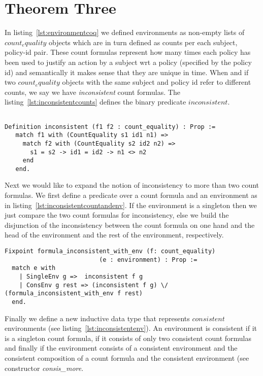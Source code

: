 \section{Theorem Three}

In listing~\ref{lst:environmentcoq} we defined environments as non-empty lists of $count_equality$ objects which are in turn defined as counts per each subject, policy-id pair. These count formulas represent how many times each policy has been used to justify an action by a subject wrt a policy (specified by the policy id) and semantically it makes sense that they are unique in time. When and if two $count_equality$ objects with the same subject and policy id refer to different counts, we say we have \emph{inconsistent} count formulas. The listing~\ref{lst:inconsistentcounts} defines the binary predicate $inconsistent$.

\lstset{language=Coq}
\begin{lstlisting}[frame=single, caption={Inconsistent Count Formulas}, label={lst:inconsistentcounts}]

Definition inconsistent (f1 f2 : count_equality) : Prop :=
   match f1 with (CountEquality s1 id1 n1) =>
     match f2 with (CountEquality s2 id2 n2) =>       
       s1 = s2 -> id1 = id2 -> n1 <> n2
     end 
   end.

\end{lstlisting}


Next we would like to expand the notion of inconsistency to more than two count formulas. We first define a predicate over a count formula and an environment as in listing~\ref{lst:inconsistentcountandenv}. If the environment is a singleton then we just compare the two count formulas for inconsistency, else we build the disjunction of the inconsistency between the count formula on one hand and the head of the environment and the rest of the environment, respectively. 

\lstset{language=Coq}
\begin{lstlisting}[frame=single, caption={Inconsistent Count Formula And Environment}, label={lst:inconsistentcountandenv}]
Fixpoint formula_inconsistent_with_env (f: count_equality)
                          (e : environment) : Prop :=
  match e with
    | SingleEnv g =>  inconsistent f g
    | ConsEnv g rest => (inconsistent f g) \/ (formula_inconsistent_with_env f rest)
  end.
\end{lstlisting}

Finally we define a new inductive data type that represents $consistent$ environments (see listing~\ref{lst:inconsistentenv}). An environment is consistent if it is a singleton count formula, if it consists of only two consistent count formulas and finally if the environment consists of a consistent environment and the consistent  composition of a count formula and the consistent environment (see constructor \emph{consis_more}.

